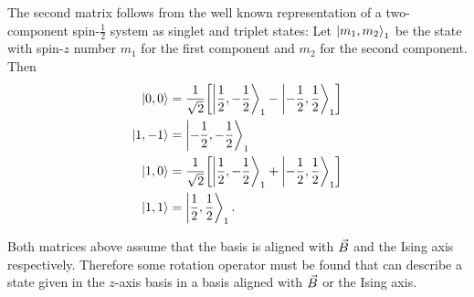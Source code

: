 \documentclass[a4paper]{article}
\begin{document}
The second matrix follows from the well known representation of a two-component
spin-\(\frac{1}{2}\) system as singlet and triplet states: Let \(\ket{m_1, m_2}_1\) be the
state with spin-\(z\) number \(m_1\) for the first component and \(m_2\) for the second
component. Then
\begin{align*}
    \ket{0, 0} &= \frac{1}{\sqrt{2}}\bqty{\ket{\frac{1}{2}, -\frac{1}{2}}_1 -
                \ket{-\frac{1}{2}, \frac{1}{2}}_1}\\
    \ket{1, -1} &= \ket{-\frac{1}{2}, -\frac{1}{2}}_1\\
    \ket{1, 0} &= \frac{1}{\sqrt{2} }\bqty{\ket{\frac{1}{2}, -\frac{1}{2}}_1 +
            \ket{-\frac{1}{2}, \frac{1}{2}}_1}\\
    \ket{1, 1} &= \ket{\frac{1}{2}, \frac{1}{2}}_1
.\end{align*}

Both matrices above assume that the basis is aligned with \(\vec{B}\) and the Ising axis
respectively. Therefore some rotation operator must be found that can describe a state
given in the \(z\)-axis basis in a basis aligned with \(\vec{B}\) or the Ising axis.
\end{document}
